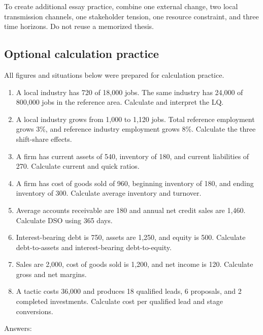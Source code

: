 \documentclass[11pt,letterpaper,oneside,openany]{book}
\begin{document}
To create additional essay practice, combine one external change, two local transmission channels, one stakeholder tension, one resource constraint, and three time horizons. Do not reuse a memorized thesis.


\subsection[Optional calculation practice]{Optional calculation practice}
All figures and situations below were prepared for calculation practice.


\begin{enumerate}
\item A local industry has 720 of 18,000 jobs. The same industry has 24,000 of 800,000 jobs in the reference area. Calculate and interpret the LQ.
\item A local industry grows from 1,000 to 1,120 jobs. Total reference employment grows 3\%, and reference industry employment grows 8\%. Calculate the three shift-share effects.
\item A firm has current assets of 540, inventory of 180, and current liabilities of 270. Calculate current and quick ratios.
\item A firm has cost of goods sold of 960, beginning inventory of 180, and ending inventory of 300. Calculate average inventory and turnover.
\item Average accounts receivable are 180 and annual net credit sales are 1,460. Calculate DSO using 365 days.
\item Interest-bearing debt is 750, assets are 1,250, and equity is 500. Calculate debt-to-assets and interest-bearing debt-to-equity.
\item Sales are 2,000, cost of goods sold is 1,200, and net income is 120. Calculate gross and net margins.
\item A tactic costs 36,000 and produces 18 qualified leads, 6 proposals, and 2 completed investments. Calculate cost per qualified lead and stage conversions.
\end{enumerate}


Answers:
\end{document}
